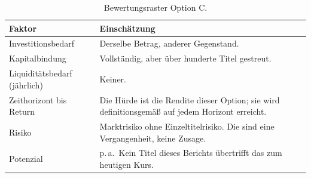 \begin{table}[htbp]\centering\small
\caption{Bewertungsraster Option C.}\label{tab:raster-c}
\begin{tabularx}{\linewidth}{@{}lX@{}}\toprule
Faktor & Einsch\"atzung\\\midrule
Investitionsbedarf & Derselbe Betrag, anderer Gegenstand.\\
Kapitalbindung & Vollst\"andig, aber \"uber hunderte Titel gestreut.\\
Liquidit\"atsbedarf (j\"ahrlich) & Keiner.\\
Zeithorizont bis Return & Die H\"urde ist die Rendite dieser Option; sie wird
definitionsgem\"a{\ss} auf jedem Horizont erreicht.\\
Risiko & Marktrisiko ohne Einzeltitelrisiko. Die \Pz{\Huerde} sind eine Vergangenheit,
keine Zusage.\\
Potenzial & \OptionCIrr{} p.\,a.\ Kein Titel dieses Berichts \"ubertrifft das zum heutigen
Kurs.\\
\bottomrule\end{tabularx}\end{table}

